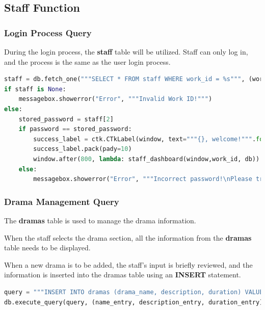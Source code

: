 \documentclass[12pt]{article}
\begin{document}
\subsection{Staff Function}
\subsubsection{Login Process Query}
\par During the login process, the \textbf{staff} table will be utilized. 
Staff can only log in, and the process is the same as the user login process.

\begin{tcolorbox}[colframe=black, colback=white, boxrule=0.4mm, sharp corners=southwest, title=Excerpt of Staff Login Code]
    \begin{lstlisting}[language=Python, breaklines=true]
staff = db.fetch_one("""SELECT * FROM staff WHERE work_id = %s""", (work_id,))
if staff is None:
    messagebox.showerror("Error", """Invalid Work ID!""")
else:
    stored_password = staff[2]
    if password == stored_password:
        success_label = ctk.CTkLabel(window, text="""{}, welcome!""".format(staff[1]), font=("Arial", 20), text_color="green")
        success_label.pack(pady=10)
        window.after(800, lambda: staff_dashboard(window,work_id, db))
    else:
        messagebox.showerror("Error", """Incorrect password!\nPlease try again!""")
\end{lstlisting}
\end{tcolorbox}

\subsubsection{Drama Management Query} 
\par The \textbf{dramas} table is used to manage the drama information.
\par When the staff selects the drama section, all the information from the \textbf{dramas} table needs to be displayed. 
\par When a new drama is to be added, the staff's input is briefly reviewed, and the information is inserted into the dramas table using an \textbf{INSERT} statement. 
\begin{tcolorbox}[colframe=black, colback=white, boxrule=0.4mm, sharp corners=southwest, title=Excerpt of Drama Add Code]
    \begin{lstlisting}[language=Python, breaklines=true]
query = """INSERT INTO dramas (drama_name, description, duration) VALUES (%s, %s, %s)"""
db.execute_query(query, (name_entry, description_entry, duration_entry))
\end{lstlisting}
\end{tcolorbox}
\end{document}
